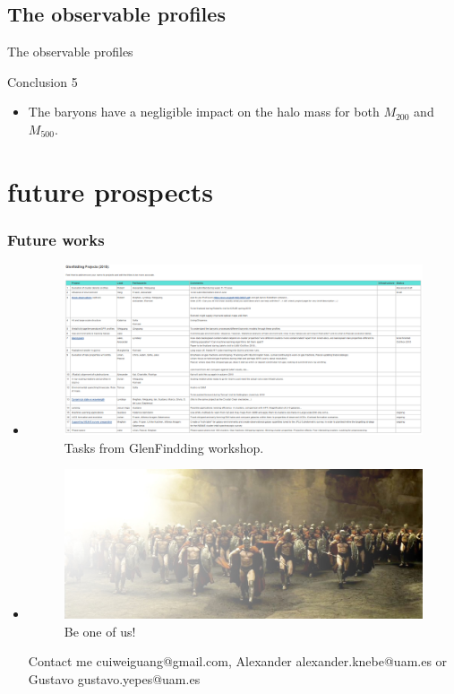 \documentclass[aspectratio=43]{beamer}
\begin{document}
\subsection{The observable profiles}\label{Li}
\begin{frame}{The observable profiles}

\end{frame}
\begin{frame}{Conclusion 5}
  {
  \begin{itemize}
    \item The baryons have a negligible impact on the halo mass for both $M_{200}$ and $M_{500}$.
  \end{itemize}}
\end{frame}

\section{future prospects}

\begin{frame}
  \frametitle{Future works}
  \begin{itemize}
    \item<1|only@1>[]{
    \begin{figure}
      \includegraphics[width=\linewidth]{Tasks18}
      \caption{Tasks from GlenFindding workshop.}
    \end{figure}}
    \item<2|only@2>[]{
      \begin{figure}
        \includegraphics[width=\linewidth]{The300}
        \caption{Be one of us!}
      \end{figure}
      Contact me \alert{cuiweiguang@gmail.com}, Alexander \alert{alexander.knebe@uam.es} or Gustavo \alert{gustavo.yepes@uam.es}}
  \end{itemize}

\end{frame}
\end{document}
